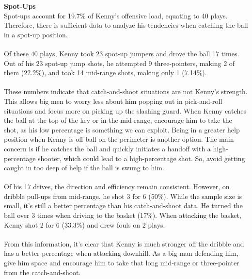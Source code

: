\documentclass[a4paper,12pt]{article}
\begin{document}
\begin{multicols}{2}
    {\large \noindent \textbf{Spot-Ups}} \\ 
    Spot-ups account for 19.7\% of Kenny's offensive load, equating to 40 plays. Therefore, there is sufficient data to analyze his tendencies when catching the ball in a spot-up position. \\ \\
    Of these 40 plays, Kenny took 23 spot-up jumpers and drove the ball 17 times. Out of his 23 spot-up jump shots, he attempted 9 three-pointers, making 2 of them (22.2\%), and took 14 mid-range shots, making only 1 (7.14\%). \\ \\
    These numbers indicate that catch-and-shoot situations are not Kenny's strength. This allows big men to worry less about him popping out in pick-and-roll situations and focus more on picking up the slashing guard. When Kenny catches the ball at the top of the key or in the mid-range, encourage him to take the shot, as his low percentage is something we can exploit. Being in a greater help position when Kenny is off-ball on the perimeter is another option. The main concern is if he catches the ball and quickly initiates a handoff with a high-percentage shooter, which could lead to a high-percentage shot. So, avoid getting caught in too deep of help if the ball is swung to him. \\ \\
    Of his 17 drives, the direction and efficiency remain consistent. However, on dribble pull-ups from mid-range, he shot 3 for 6 (50\%). While the sample size is small, it's still a better percentage than his catch-and-shoot data. He turned the ball over 3 times when driving to the basket (17\%). When attacking the basket, Kenny shot 2 for 6 (33.3\%) and drew fouls on 2 plays. \\ \\
    From this information, it's clear that Kenny is much stronger off the dribble and has a better percentage when attacking downhill. As a big man defending him, give him space and encourage him to take that long mid-range or three-pointer from the catch-and-shoot.

    \vspace{1em}
    

\end{multicols}
\end{document}

